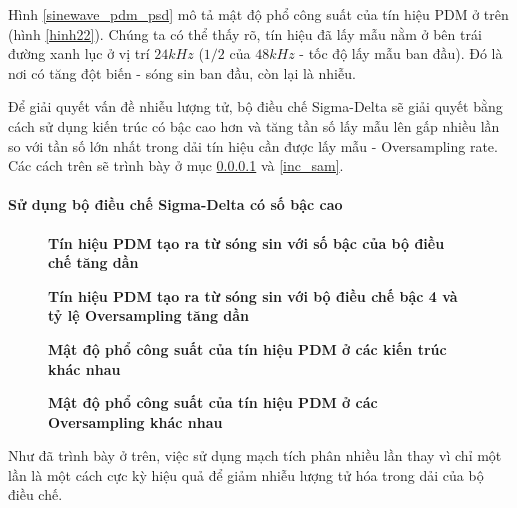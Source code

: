 Hình \ref{sinewave_pdm_psd} mô tả mật độ phổ công suất của tín hiệu PDM ở trên (hình \ref{hinh22}). Chúng ta có thể thấy rõ, tín hiệu đã lấy mẫu nằm ở bên trái đường xanh lục ở vị trí $24kHz$ ($1/2$ của $48kHz$ - tốc độ lấy mẫu ban đầu). Đó là nơi có tăng đột biến - sóng sin ban đầu, còn lại là nhiễu.

Để giải quyết vấn đề nhiễu lượng tử, bộ điều chế Sigma-Delta sẽ giải quyết bằng cách sử dụng kiến trúc có bậc cao hơn và tăng tần số lấy mẫu lên gấp nhiều lần so với tần số lớn nhất trong dải tín hiệu cần được lấy mẫu - Oversampling rate. Các cách trên sẽ trình bày ở mục \ref{inc_order} và \ref{inc_sam}.
\paragraph{Sử dụng bộ điều chế Sigma-Delta có số bậc cao} \label{inc_order}
\begin{figure}
    \centering
    
    \caption[Tín hiệu PDM tạo ra từ sóng sin với số bậc của bộ điều chế tăng dần]{\bfseries \fontsize{12pt}{0pt}\selectfont Tín hiệu PDM tạo ra từ sóng sin với số bậc của bộ điều chế tăng dần}
    \label{sinewave_to_pdm_different_orders}
\end{figure}
\begin{figure}
    \centering
    
    \caption[Tín hiệu PDM tạo ra từ sóng sin với bộ điều chế bậc 4 và tỷ lệ Oversampling tăng dần]{\bfseries \fontsize{12pt}{0pt}\selectfont Tín hiệu PDM tạo ra từ sóng sin với bộ điều chế bậc 4 và tỷ lệ Oversampling tăng dần}
    \label{sinewave_to_pdm_different_osr}
\end{figure}
\begin{figure}
    \centering
    
    \caption[Mật độ phổ công suất của tín hiệu PDM ở các kiến trúc khác nhau]{\bfseries \fontsize{12pt}{0pt}\selectfont Mật độ phổ công suất của tín hiệu PDM ở các kiến trúc khác nhau}
    \label{sinewave_pdm_psd_different_orders}
\end{figure}
\begin{figure}[ht!]
    \centering
    
    \caption[Mật độ phổ công suất của tín hiệu PDM ở các Oversampling khác nhau]{\bfseries \fontsize{12pt}{0pt}\selectfont Mật độ phổ công suất của tín hiệu PDM ở các Oversampling khác nhau}
    \label{sinewave_pdm_psd_different_osr}
\end{figure}
Như đã trình bày ở trên, việc sử dụng mạch tích phân nhiều lần thay vì chỉ một lần là một cách cực kỳ hiệu quả để giảm nhiễu lượng tử hóa trong dải của bộ điều chế.


